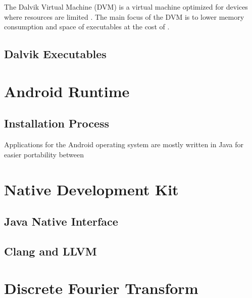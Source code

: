 The Dalvik Virtual Machine (DVM) is a virtual machine optimized for devices where resources are limited \cite{android:dalvik:internals}. The main focus of the DVM is to lower memory consumption and space of executables at the cost of \cite{security2009analysis}. 


\subsection{Dalvik Executables}



\section{Android Runtime}



\subsection{Installation Process}


Applications for the Android operating system are mostly written in Java for easier portability between \cite[p.~33]{nolan2012decompiling}

\section{Native Development Kit}

\subsection{Java Native Interface}

\subsection{Clang and LLVM}

\section{Discrete Fourier Transform}

